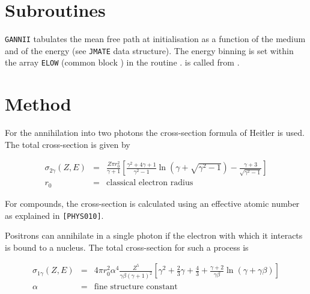   
\section{Subroutines}
{\tt GANNII} tabulates the mean free path at initialisation as a 
function of the medium and of the energy (see {\tt JMATE} data structure).
The energy binning is set within the array {\tt ELOW} (common block 
)
in the routine .  is called from .

\section{Method}
For the annihilation into two photons the cross-section formula 
of Heitler is used. The total 
cross-section is given by~\cite{bib-EGS3,bib-HEIT}

\begin{eqnarray}
\sigma_{2\gamma} (Z,E) & = & \frac{Z \pi r^2_0}{\gamma +1}
      \left[\frac{\gamma^2 + 4 \gamma +1}{\gamma^2 -1}
      \ln \left(\gamma +\sqrt{\gamma^2 -1} \right)  -\frac
       {\gamma +3}{\sqrt{\gamma^2 -1}} \right]  \\
r_0 & = & \mbox{classical electron radius} \nonumber
\end{eqnarray}

For compounds, the cross-section is calculated using an effective
atomic number as explained in {\tt [PHYS010]}.

Positrons can annihilate in a single photon if the electron
with which it interacts is bound to a nucleus.
The total cross-section for such a process is

\begin{eqnarray}
\sigma_{1\gamma} (Z,E) & = & 4 \pi r_0^2 \alpha^4 \frac{Z^5}
        {\gamma \beta (\gamma + 1)^2}
        \left[ \gamma^2 + \frac{2}{3}\gamma + \frac{4}{3}
        + \frac{\gamma + 2}{\gamma \beta} \ln(\gamma + \gamma \beta) \right] \\
\alpha & = & \mbox{fine structure constant} \nonumber 
\end{eqnarray}

